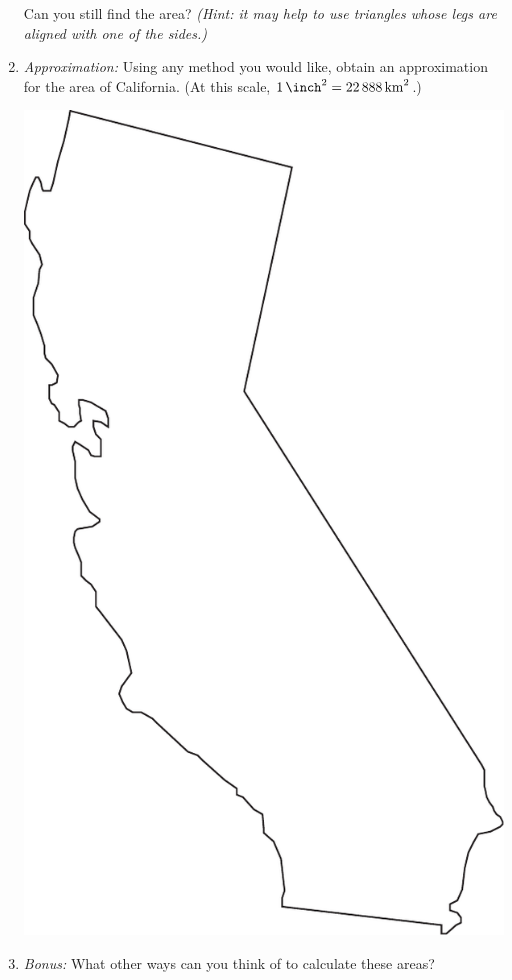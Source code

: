\documentclass[12pt]{article}
\begin{document}
\begin{enumerate}
  \vspace{0.5in}
  Can you still find the area? \emph{(Hint: it may help to use
    triangles whose legs are aligned with one of the sides.)}
  \clearpage
\item \emph{Approximation:} Using any method you would like, obtain an
  approximation for the area of California. (At this scale,
  $\SI{1}{\square\inch} = \SI{22888}{\square\kilo\meter}$.)
  \vspace{0.5in}
  \begin{center}
    \includegraphics{california.pdf}
  \end{center}
  \vspace{0.5in}
\item \emph{Bonus:} What other ways can you think of to calculate
  these areas?
\end{enumerate}
\end{document}
